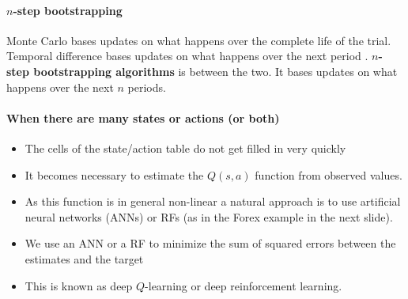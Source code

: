 \paragraph{$n$-step bootstrapping} Monte Carlo bases updates on what happens over the complete life of the trial.
Temporal difference bases updates on what happens over the next period .
\textbf{$n$-step bootstrapping algorithms} is between the two. It bases updates on what happens over the next $n$ periods.

\paragraph{When there are many states or actions (or both)}

\begin{itemize}
    \item The cells of the state/action table do not get filled in very quickly
    \item It becomes necessary to estimate the $Q(s,a)$ function from observed values.
    \item As this function is in general non-linear a natural approach is to use artificial neural networks (ANNs) or RFs (as in the Forex example in the next slide).
    \item We use an ANN or a RF to minimize the sum of squared errors between the estimates and the target
    \item This is known as deep $Q$-learning or deep reinforcement learning.
\end{itemize}

